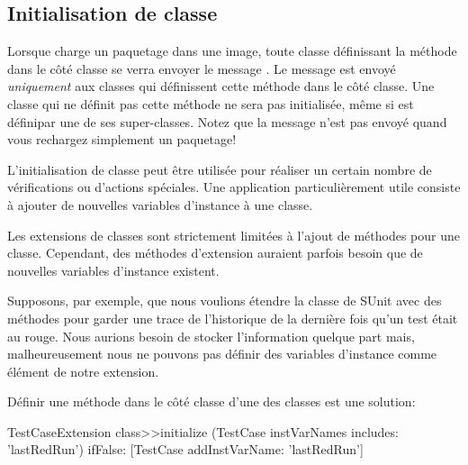 \documentclass[a4paper,10pt,twoside]{book}
\begin{document}
\subsection{Initialisation de classe}

Lorsque \MC charge un paquetage dans une image, toute classe
définissant la méthode   dans le côté classe se verra
envoyer le message  . 
Le message est envoyé \emph{uniquement} aux classes qui définissent
cette méthode dans le côté classe. Une classe qui ne définit
  pas cette méthode ne sera pas initialisée, même si  
  est définipar une de ses super-classes.
Notez que la message  n'est pas envoyé quand vous
rechargez simplement un paquetage!


L'initialisation de classe peut être utilisée pour réaliser un certain
nombre de vérifications ou d'actions spéciales. Une application
particulièrement utile consiste à ajouter de nouvelles variables
d'instance à une classe.

Les extensions de classes sont strictement limitées à l'ajout de
méthodes pour une classe. Cependant, des méthodes d'extension auraient
parfois besoin que de nouvelles variables d'instance existent.

Supposons, par exemple, que nous voulions étendre la classe 
 de  SUnit avec des méthodes pour garder une trace de
l'historique de la dernière fois qu'un test était au rouge. Nous
aurions besoin de stocker l'information quelque part mais,
malheureusement nous ne pouvons pas définir des variables d'instance
comme élément de notre extension.

Définir une méthode 
  dans le côté classe d'une des classes est une
 solution:

\begin{code}{}
TestCaseExtension class>>initialize
	(TestCase instVarNames includes: 'lastRedRun') 
		ifFalse: [TestCase addInstVarName: 'lastRedRun']
\end{code}

\end{document}
